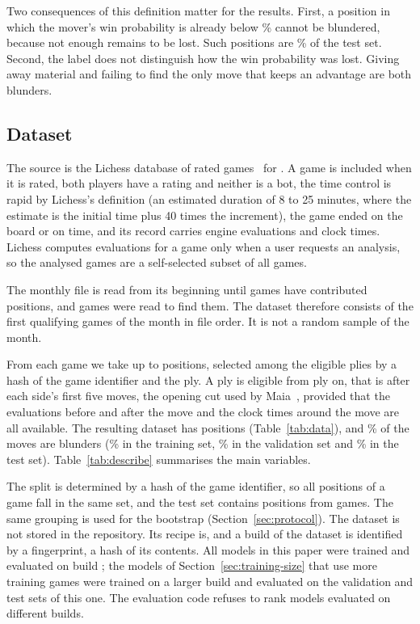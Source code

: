 \documentclass[11pt]{article}
\begin{document}
Two consequences of this definition matter for the results. First, a position
in which the mover's win probability is already below
\% cannot be blundered, because not enough remains to
be lost.\iflook{} Such positions are \% of the test
set.\fi{} Second, the label does not distinguish how the win probability was
lost. Giving away material and failing to find the only move that keeps an
advantage are both blunders.

\subsection{Dataset}

The source is the Lichess database of rated games~\cite{lichessdb} for
. A game is included when it is rated, both players have a
rating and neither is a bot, the time control is rapid by Lichess's
definition (an estimated duration of 8 to 25 minutes, where the estimate is
the initial time plus 40 times the increment), the game ended on the board
or on time, and its record carries engine evaluations and clock times.
Lichess computes evaluations for a game only when a user requests an
analysis, so the analysed games are a self-selected subset of all games.

The monthly file is read from its beginning until  games have
contributed positions, and  games were read to find
them. The dataset therefore consists of the first qualifying games of the
month in file order. It is not a random sample of the month.

From each game we take up to  positions, selected among
the eligible plies by a hash of the game identifier and the ply. A ply is
eligible from ply  on, that is after each side's first five
moves, the opening cut used by Maia~\cite{maia}, provided that the
evaluations before and after the move and the clock times around the move are
all available. The resulting dataset has  positions
(Table~\ref{tab:data})\iflook, and \% of the moves are blunders
(\% in the training set, \% in the
validation set and \% in the test set).
Table~\ref{tab:describe} summarises the main variables\fi.

The split is determined by a hash of the game identifier, so all positions
of a game fall in the same set, and the test set contains positions from
 games. The same grouping is used for the bootstrap
(Section~\ref{sec:protocol}). The dataset is not stored in the repository.
Its recipe is, and a build of the dataset is identified by a fingerprint, a
hash of its contents. All models in this paper were trained and evaluated on
build \ifmore; the models of
Section~\ref{sec:training-size} that use more training games were trained on
a larger build and evaluated on the validation and test sets of this
one\fi. The evaluation code refuses to rank models evaluated on different
builds.
\end{document}
